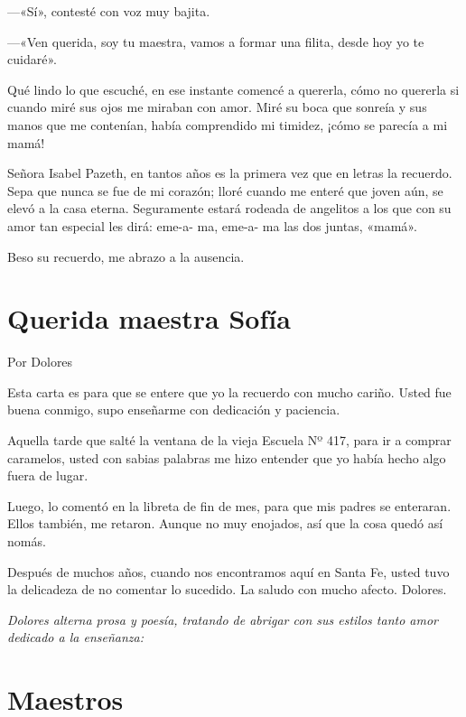 \documentclass[11pt,twoside,openright,a5paper]{book}
\begin{document}
---«Sí», contesté con voz muy bajita.

---«Ven querida, soy tu maestra, vamos a formar una filita, desde hoy yo te cuidaré». 

Qué lindo lo que escuché, en ese instante comencé a quererla, cómo no quererla si cuando miré sus ojos me miraban con amor. Miré su boca que sonreía y sus manos que me contenían, había comprendido mi timidez, ¡cómo se parecía a mi mamá!

Señora Isabel Pazeth, en tantos años es la primera vez que en letras la recuerdo. Sepa que nunca se fue de mi corazón; lloré cuando me enteré que joven aún, se elevó a la casa eterna. Seguramente estará rodeada de angelitos a los que con su amor tan especial les dirá: eme-a- ma, eme-a- ma las dos juntas, «mamá».

Beso su recuerdo, me abrazo a la ausencia.

\section*{Querida maestra Sofía}

                                                                                 \begin{flushright}Por Dolores\end{flushright}

Esta carta es para que se entere que yo la recuerdo con mucho cariño. Usted fue buena conmigo, supo enseñarme con dedicación y paciencia.

Aquella tarde que salté la ventana de la vieja Escuela Nº 417, para ir a comprar caramelos, usted con sabias palabras me hizo entender que yo había hecho algo fuera de lugar.

Luego,  lo comentó en la libreta de fin de mes, para que mis padres se enteraran. Ellos también, me retaron. Aunque no muy enojados, así que la cosa quedó así nomás.

Después de muchos años, cuando nos encontramos aquí en Santa Fe, usted tuvo la delicadeza de no comentar lo sucedido. La saludo con mucho afecto. Dolores.

\vspace{0.5cm}
\emph{Dolores alterna prosa y poesía, tratando de abrigar con sus estilos tanto amor dedicado a la enseñanza:}


\section*{Maestros}
\end{document}
